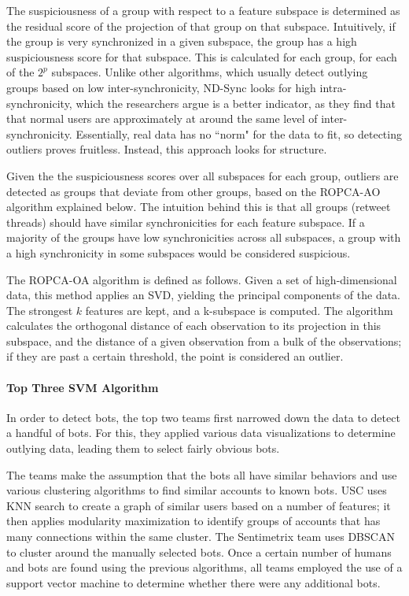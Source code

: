\documentclass[11pt, oneside]{article}   	%
\begin{document}
\quad The suspiciousness of a group with respect to a feature subspace is determined as the residual score of the projection of that group on that subspace.
Intuitively, if the group is very synchronized in a given subspace, the group has a high suspiciousness score for that subspace.
This is calculated for each group, for each of the $2^p$ subspaces.
Unlike other algorithms, which usually detect outlying groups based on low inter-synchronicity, ND-Sync \cite{ndsync} looks for high intra-synchronicity, which the researchers argue is a better indicator, as they find that that normal users are approximately at around the same level of inter-synchronicity.
Essentially, real data has no ``norm" for the data to fit, so detecting outliers proves fruitless.
Instead, this approach looks for structure.

\quad Given the the suspiciousness scores over all subspaces for each group, outliers are detected as groups that deviate from other groups, based on the ROPCA-AO algorithm explained below.
The intuition behind this is that all groups (retweet threads) should have similar synchronicities for each feature subspace.
If a majority of the groups have low synchronicities across all subspaces, a group with a high synchronicity in some subspaces would be considered suspicious.

\quad The ROPCA-OA algorithm is defined as follows.
Given a set of high-dimensional data, this method applies an SVD, yielding the principal components of the data.
The strongest $k$ features are kept, and a k-subspace is computed.
The algorithm calculates the orthogonal distance of each observation to its projection in this subspace, and the distance of a given observation from a bulk of the observations; if they are past a certain threshold, the point is considered an outlier.

\paragraph{Top Three SVM Algorithm}

\quad In order to detect bots, the top two teams first narrowed down the data to detect a handful of bots.
For this, they applied various data visualizations to determine outlying data, leading them to select fairly obvious bots.

\quad The teams make the assumption that the bots all have similar behaviors and use various clustering algorithms to find similar accounts to known bots.
USC uses KNN search to create a graph of similar users based on a number of features; it then applies modularity maximization to identify groups of accounts that has many connections within the same cluster.
The Sentimetrix team uses DBSCAN to cluster around the manually selected bots.
Once a certain number of humans and bots are found using the previous algorithms, all teams employed the use of a support vector machine to determine whether there were any additional bots.
\end{document}
